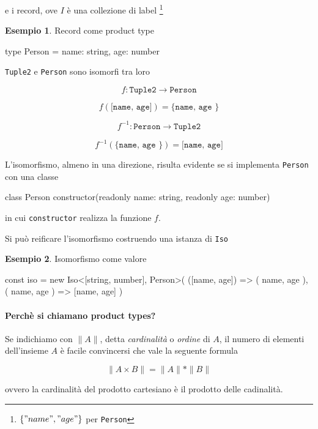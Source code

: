 \documentclass[12pt]{article}
\theoremstyle{definition}
\newtheorem{example}{Esempio}[subsection]
\newenvironment{code}
  {\vspace{0.5cm} \VerbatimEnvironment\begin{typescriptcode}}
  {\end{typescriptcode} \vspace{0.2cm}}
\begin{document}
e i record, ove $I$ è una collezione di label
\footnote{$\{ "name", "age" \}$ per \texttt{Person}}

\begin{example}
Record come product type

\begin{code}
type Person = {
  name: string,
  age: number
}
\end{code}
\end{example}

\texttt{Tuple2} e \texttt{Person} sono isomorfi tra loro

$$
f: \texttt{Tuple2} \rightarrow \texttt{Person}
$$

$$
f(\texttt{[name, age]}) = \texttt{\{ name, age  \}}
$$

$$
f^{-1}: \texttt{Person} \rightarrow \texttt{Tuple2}
$$

$$
f^{-1}(\texttt{\{ name, age  \}}) = \texttt{[name, age]}
$$

L'isomorfismo, almeno in una direzione, risulta evidente se si implementa \texttt{Person} con una classe

\begin{code}
class Person {
  constructor(readonly name: string, readonly age: number) {}
}
\end{code}

in cui \texttt{constructor} realizza la funzione $f$.

Si può reificare l'isomorfismo costruendo una istanza di \texttt{Iso}

\begin{example}
Isomorfismo come valore

\begin{code}
const iso = new Iso<[string, number], Person>(
  ([name, age]) => ({ name, age }),
  ({ name, age }) => [name, age]
)
\end{code}
\end{example}

\paragraph{Perchè si chiamano product types?}

Se indichiamo con $\|A\|$, detta \emph{cardinalità} o \emph{ordine} di $A$, il numero di elementi
dell'insieme $A$ è facile convincersi che vale la seguente formula

$$
\|A \times B\| = \|A\| * \|B\|
$$

ovvero la cardinalità del prodotto cartesiano è il prodotto delle cadinalità.
\end{document}
